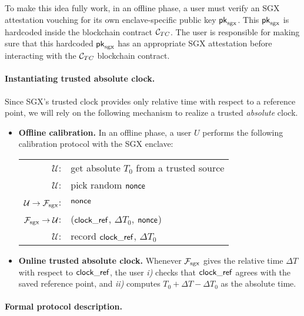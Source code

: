 To make this idea fully work, in an offline phase, 
a user must verify an SGX attestation vouching for its own enclave-specific 
public key  ${\sf pk}_{\textrm{sgx}}$.
This ${\sf pk}_{\textrm{sgx}}$ is hardcoded inside the blockchain contract ${\cal C}_{TC}$. 
The user is responsible for making sure that this hardcoded ${\sf pk}_{\textrm{sgx}}$ has an 
appropriate SGX attestation before interacting with the ${\cal C}_{TC}$ 
blockchain contract.

\paragraph{Instantiating trusted absolute clock.}
Since SGX's trusted clock provides only relative time with 
respect to a reference point, 
we will rely on 
the following mechanism to realize a trusted {\it absolute} clock. 
\begin{itemize}[leftmargin=5mm]
\item
{\bf Offline calibration.}
In an offline phase, a user $U$ performs the following calibration protocol
with the SGX enclave:


\begin{tabular}{rl}
$\mathcal{U}$: & get absolute $T_0$ from a trusted source \\
$\mathcal{U}$: & pick random ${\sf nonce}$\\
$\mathcal{U} \rightarrow \mathcal{F}_{\textrm{sgx}}$: & ${\sf nonce}$\\
$\mathcal{F}_{\textrm{sgx}} \rightarrow \mathcal{U}$: & (${\sf clock\_ref}$, $\Delta T_0$, ${\sf nonce}$)\\
$\mathcal{U}$: & record ${\sf clock\_ref}$, $\Delta T_0$
\end{tabular}


\item
{\bf Online trusted absolute clock.}
Whenever $\mathcal{F}_{\textrm{sgx}}$ gives the relative time $\Delta T$ with respect
to ${\sf clock\_ref}$, the user 
{\it i)} checks that ${\sf clock\_ref}$ agrees with the saved
reference point, and 
{\it ii)}
computes $T_0 + \Delta T - \Delta T_0$
as the absolute time.
\end{itemize}


\paragraph{Formal protocol description.}

